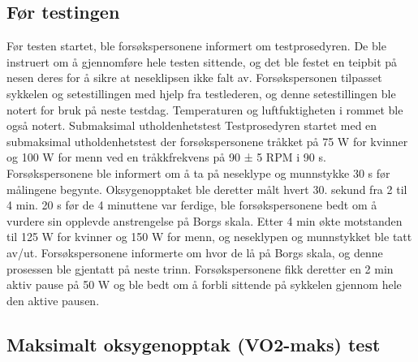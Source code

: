 \documentclass[
  letterpaper,
  DIV=11,
  numbers=noendperiod]{scrreprt}
\begin{document}
\hypertarget{fuxf8r-testingen}{%
\subsection{Før testingen}\label{fuxf8r-testingen}}

Før testen startet, ble forsøkspersonene informert om testprosedyren. De
ble instruert om å gjennomføre hele testen sittende, og det ble festet
en teipbit på nesen deres for å sikre at neseklipsen ikke falt av.
Forsøkspersonen tilpasset sykkelen og setestillingen med hjelp fra
testlederen, og denne setestillingen ble notert for bruk på neste
testdag. Temperaturen og luftfuktigheten i rommet ble også notert.
Submaksimal utholdenhetstest Testprosedyren startet med en submaksimal
utholdenhetstest der forsøkspersonene tråkket på 75 W for kvinner og 100
W for menn ved en tråkkfrekvens på 90 ± 5 RPM i 90 s. Forsøkspersonene
ble informert om å ta på neseklype og munnstykke 30 s før målingene
begynte. Oksygenopptaket ble deretter målt hvert 30. sekund fra 2 til 4
min. 20 s før de 4 minuttene var ferdige, ble forsøkspersonene bedt om å
vurdere sin opplevde anstrengelse på Borgs skala. Etter 4 min økte
motstanden til 125 W for kvinner og 150 W for menn, og neseklypen og
munnstykket ble tatt av/ut. Forsøkspersonene informerte om hvor de lå på
Borgs skala, og denne prosessen ble gjentatt på neste trinn.
Forsøkspersonene fikk deretter en 2 min aktiv pause på 50 W og ble bedt
om å forbli sittende på sykkelen gjennom hele den aktive pausen.

\hypertarget{maksimalt-oksygenopptak-vo2-maks-test}{%
\subsection{Maksimalt oksygenopptak (VO2-maks)
test}\label{maksimalt-oksygenopptak-vo2-maks-test}}
\end{document}
